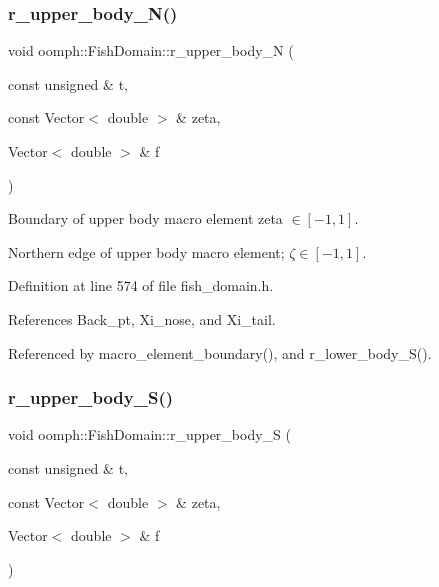 \subsubsection{\texorpdfstring{r\+\_\+upper\+\_\+body\+\_\+\+N()}{r\_upper\_body\_N()}}
{\footnotesize\ttfamily void oomph\+::\+Fish\+Domain\+::r\+\_\+upper\+\_\+body\+\_\+N (\begin{DoxyParamCaption}\item[{const unsigned \&}]{t,  }\item[{const Vector$<$ double $>$ \&}]{zeta,  }\item[{Vector$<$ double $>$ \&}]{f }\end{DoxyParamCaption})\hspace{0.3cm}{\ttfamily [private]}}



Boundary of upper body macro element zeta $ \in [-1,1] $. 

Northern edge of upper body macro element; $ \zeta \in [-1,1] $. 

Definition at line 574 of file fish\+\_\+domain.\+h.



References Back\+\_\+pt, Xi\+\_\+nose, and Xi\+\_\+tail.



Referenced by macro\+\_\+element\+\_\+boundary(), and r\+\_\+lower\+\_\+body\+\_\+\+S().

\mbox{\label{classoomph_1_1FishDomain_af30cc8b5bc73f1d2e71099c19b2a0d98}} 
\subsubsection{\texorpdfstring{r\+\_\+upper\+\_\+body\+\_\+\+S()}{r\_upper\_body\_S()}}
{\footnotesize\ttfamily void oomph\+::\+Fish\+Domain\+::r\+\_\+upper\+\_\+body\+\_\+S (\begin{DoxyParamCaption}\item[{const unsigned \&}]{t,  }\item[{const Vector$<$ double $>$ \&}]{zeta,  }\item[{Vector$<$ double $>$ \&}]{f }\end{DoxyParamCaption})\hspace{0.3cm}{\ttfamily [private]}}



